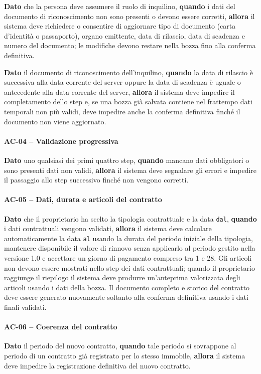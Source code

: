 \documentclass[12pt,a4paper]{article}
\begin{document}
\textbf{Dato} che la persona deve assumere il ruolo di inquilino,
\textbf{quando} i dati del documento di riconoscimento non sono presenti o devono essere corretti,
\textbf{allora} il sistema deve richiedere o consentire di aggiornare tipo di documento
(carta d'identità o passaporto), organo emittente, data di rilascio,
data di scadenza e numero del documento; le modifiche devono restare nella bozza fino alla
conferma definitiva.

\textbf{Dato} il documento di riconoscimento dell'inquilino,
\textbf{quando} la data di rilascio è successiva alla data corrente del server oppure la data di
scadenza è uguale o antecedente alla data corrente del server,
\textbf{allora} il sistema deve impedire il completamento dello step e, se una bozza già
salvata contiene nel frattempo dati temporali non più validi, deve impedire anche la conferma
definitiva finché il documento non viene aggiornato.

\paragraph{AC-04 -- Validazione progressiva}
\textbf{Dato} uno qualsiasi dei primi quattro step,
\textbf{quando} mancano dati obbligatori o sono presenti dati non validi,
\textbf{allora} il sistema deve segnalare gli errori e impedire il passaggio allo step
successivo finché non vengono corretti.

\paragraph{AC-05 -- Dati, durata e articoli del contratto}
\textbf{Dato} che il proprietario ha scelto la tipologia contrattuale e la data
\texttt{dal},
\textbf{quando} i dati contrattuali vengono validati,
\textbf{allora} il sistema deve calcolare automaticamente la data \texttt{al} usando
la durata del periodo iniziale della tipologia, mantenere disponibile il valore di rinnovo
senza applicarlo al periodo gestito nella versione 1.0 e accettare un giorno di pagamento
compreso tra 1 e 28. Gli articoli non devono essere mostrati nello step dei dati contrattuali;
quando il proprietario raggiunge il riepilogo il sistema deve produrre un'anteprima valorizzata
degli articoli usando i dati della bozza. Il documento completo e storico del contratto deve
essere generato nuovamente soltanto alla conferma definitiva usando i dati finali validati.

\paragraph{AC-06 -- Coerenza del contratto}
\textbf{Dato} il periodo del nuovo contratto,
\textbf{quando} tale periodo si sovrappone al periodo di un contratto già registrato per lo stesso
immobile,
\textbf{allora} il sistema deve impedire la registrazione definitiva del nuovo contratto.
\end{document}
